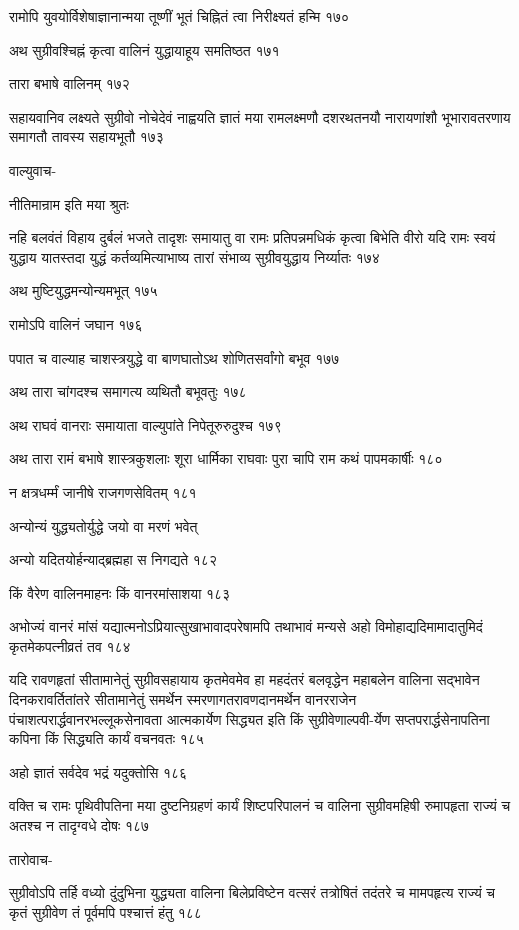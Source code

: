 रामोपि युवयोर्विशेषाज्ञानान्मया तूष्णीं भूतं चिह्नितं त्वा निरीक्ष्यतं हन्मि १७०

अथ सुग्रीवश्चिह्नं कृत्वा वालिनं युद्धायाहूय समतिष्ठत १७१

तारा बभाषे वालिनम् १७२

सहायवानिव लक्ष्यते सुग्रीवो नोचेदेवं नाह्वयति ज्ञातं मया रामलक्ष्मणौ दशरथतनयौ
नारायणांशौ भूभारावतरणाय समागतौ तावस्य सहायभूतौ १७३

वाल्युवाच-

नीतिमान्राम इति मया श्रुतः

नहि बलवंतं विहाय दुर्बलं भजते तादृशः समायातु वा रामः प्रतिपन्नमधिकं कृत्वा बिभेति वीरो
यदि रामः स्वयं युद्धाय यातस्तदा युद्धं कर्तव्यमित्याभाष्य तारां संभाव्य सुग्रीवयुद्धाय
निर्य्यातः १७४

अथ मुष्टियुद्धमन्योन्यमभूत् १७५

रामोऽपि वालिनं जघान १७६

पपात च वाल्याह चाशस्त्रयुद्धे वा बाणघातोऽथ शोणितसर्वांगो बभूव १७७

अथ तारा चांगदश्च समागत्य व्यथितौ बभूवतुः १७८

अथ राघवं वानराः समायाता वाल्युपांते निपेतूरुरुदुश्च १७९

अथ तारा रामं बभाषे शास्त्रकुशलाः शूरा धार्मिका राघवाः पुरा चापि राम कथं
पापमकार्षीः १८०

न क्षत्रधर्म्मं जानीषे राजगणसेवितम् १८१

अन्योन्यं युद्ध्यतोर्युद्धे जयो वा मरणं भवेत्

अन्यो यदितयोर्हन्याद्ब्रह्महा स निगद्यते १८२

किं वैरेण वालिनमाहनः किं वानरमांसाशया १८३

अभोज्यं वानरं मांसं यद्यात्मनोऽप्रियात्सुखाभावादपरेषामपि तथाभावं मन्यसे अहो
विमोहाद्यदिमामादातुमिदं कृतमेकपत्नीव्रतं तव १८४

यदि रावणहृतां सीतामानेतुं सुग्रीवसहायाय कृतमेवमेव हा महदंतरं बलवृद्धेन महाबलेन वालिना
सद्भावेन दिनकरावर्तितांतरे सीतामानेतुं समर्थेन स्मरणागतरावणदानमर्थेन वानरराजेन
पंचाशत्परार्द्धवानरभल्लूकसेनावता आत्मकार्येण सिद्ध्यत इति किं सुग्रीवेणाल्पवी-र्येण
सप्तपरार्द्धसेनापतिना कपिना किं सिद्ध्यति कार्यं वचनवतः १८५

अहो ज्ञातं सर्वदेव भद्रं यदुक्तोसि १८६

वक्ति च रामः पृथिवीपतिना मया दुष्टनिग्रहणं कार्यं शिष्टपरिपालनं च वालिना
सुग्रीवमहिषी रुमापहृता राज्यं च अतश्च न तादृग्वधे दोषः १८७

तारोवाच-

सुग्रीवोऽपि तर्हि वध्यो दुंदुभिना युद्ध्यता वालिना बिलेप्रविष्टेन वत्सरं तत्रोषितं तदंतरे च
मामपहृत्य राज्यं च कृतं सुग्रीवेण तं पूर्वमपि पश्चात्तं हंतु १८८

